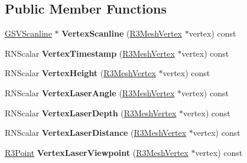 \subsection*{Public Member Functions}
\begin{DoxyCompactItemize}
\item 
\hyperlink{class_g_s_v_scanline}{G\+S\+V\+Scanline} $\ast$ {\bfseries Vertex\+Scanline} (\hyperlink{class_r3_mesh_vertex}{R3\+Mesh\+Vertex} $\ast$vertex) const \hypertarget{class_g_s_v_mesh_a3b84f2a88828463f0043f7a727f230a8}{}\label{class_g_s_v_mesh_a3b84f2a88828463f0043f7a727f230a8}

\item 
R\+N\+Scalar {\bfseries Vertex\+Timestamp} (\hyperlink{class_r3_mesh_vertex}{R3\+Mesh\+Vertex} $\ast$vertex) const \hypertarget{class_g_s_v_mesh_a5da24209e27df3dbe3f60e229f72a1f1}{}\label{class_g_s_v_mesh_a5da24209e27df3dbe3f60e229f72a1f1}

\item 
R\+N\+Scalar {\bfseries Vertex\+Height} (\hyperlink{class_r3_mesh_vertex}{R3\+Mesh\+Vertex} $\ast$vertex) const \hypertarget{class_g_s_v_mesh_a875fb9d6f018d4b2863924dcda4b5659}{}\label{class_g_s_v_mesh_a875fb9d6f018d4b2863924dcda4b5659}

\item 
R\+N\+Scalar {\bfseries Vertex\+Laser\+Angle} (\hyperlink{class_r3_mesh_vertex}{R3\+Mesh\+Vertex} $\ast$vertex) const \hypertarget{class_g_s_v_mesh_ac4399a5ad8392efd8739fd210693d42d}{}\label{class_g_s_v_mesh_ac4399a5ad8392efd8739fd210693d42d}

\item 
R\+N\+Scalar {\bfseries Vertex\+Laser\+Depth} (\hyperlink{class_r3_mesh_vertex}{R3\+Mesh\+Vertex} $\ast$vertex) const \hypertarget{class_g_s_v_mesh_abf70269575cb0c5052583ed27034decd}{}\label{class_g_s_v_mesh_abf70269575cb0c5052583ed27034decd}

\item 
R\+N\+Scalar {\bfseries Vertex\+Laser\+Distance} (\hyperlink{class_r3_mesh_vertex}{R3\+Mesh\+Vertex} $\ast$vertex) const \hypertarget{class_g_s_v_mesh_a966c4a17ac4596af71d20e4a44386e33}{}\label{class_g_s_v_mesh_a966c4a17ac4596af71d20e4a44386e33}

\item 
\hyperlink{class_r3_point}{R3\+Point} {\bfseries Vertex\+Laser\+Viewpoint} (\hyperlink{class_r3_mesh_vertex}{R3\+Mesh\+Vertex} $\ast$vertex) const \hypertarget{class_g_s_v_mesh_a2c3170c3398e13ea8c0f6e65ae692e51}{}\label{class_g_s_v_mesh_a2c3170c3398e13ea8c0f6e65ae692e51}


\end{DoxyCompactItemize}
